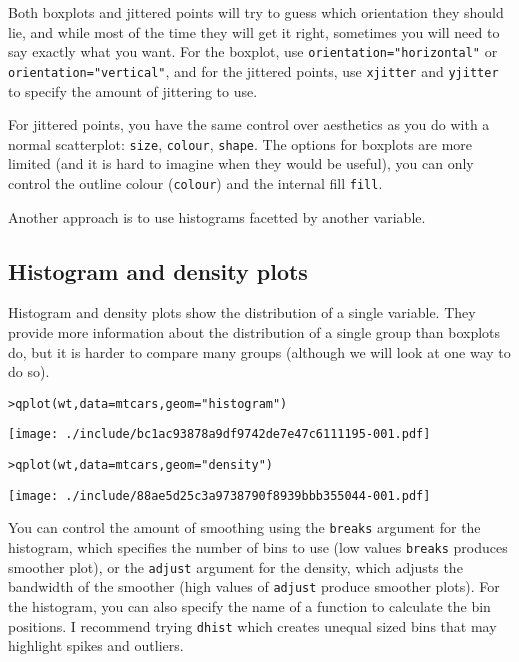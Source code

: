 Both boxplots and jittered points will try to guess which orientation they should lie, and while most of the time they will get it right, sometimes you will need to say exactly what you want.  For the boxplot, use {\tt orientation="horizontal"} or {\tt orientation="vertical"}, and for the jittered points, use {\tt xjitter} and {\tt yjitter} to specify the amount of jittering to use. 

For jittered points, you have the same control over aesthetics as you do with a normal scatterplot: {\tt size}, {\tt colour}, {\tt shape}.  The options for boxplots are more limited (and it is hard to imagine when they would be useful), you can only control the outline colour ({\tt colour}) and the internal fill {\tt fill}.

Another approach is to use histograms facetted by another variable.

\subsection{Histogram and density plots}\label{sub:density}

Histogram and density plots show the distribution of a single variable.  They provide more information about the distribution of a single group than boxplots do, but it is harder to compare many groups (although we will look at one way to do so).

\begin{alltt}
> qplot(wt, data = mtcars, geom = "histogram")
\end{alltt}
\texttt{[image: ./include/bc1ac93878a9df9742de7e47c6111195-001.pdf]}
\begin{alltt}

> qplot(wt, data = mtcars, geom = "density")
\end{alltt}
\texttt{[image: ./include/88ae5d25c3a9738790f8939bbb355044-001.pdf]}
\begin{alltt}

\end{alltt}

You can control the amount of smoothing using the {\tt breaks} argument for the histogram, which specifies the number of bins to use (low values {\tt breaks} produces smoother plot), or the {\tt adjust} argument for the density, which adjusts the bandwidth of the smoother (high values of {\tt adjust} produce smoother plots).  For the histogram, you can also specify the name of a function to calculate the bin positions.  I recommend trying {\tt dhist} which creates unequal sized bins that may highlight spikes and outliers.

